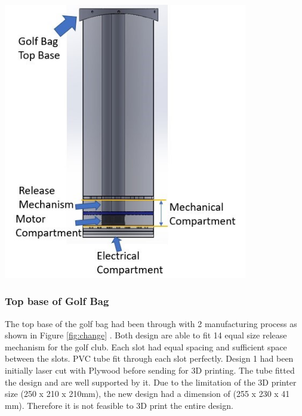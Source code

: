 \documentclass[11pt,landscape]{article}
\newenvironment{Figure}
  {\par\medskip\noindent\minipage{\linewidth}}
  {\endminipage\par\medskip}
\begin{document}
\begin{multicols}{3}
    
    \begin{Figure}
        \begin{center}
            \includegraphics[width=0.8\textwidth]{Figure16.jpg}
            \label{fig:golfbag}
        \end{center}
    \end{Figure}
    
    
    
    \subsubsection{Top base of Golf Bag}
    The top base of the golf bag had been through with 2 manufacturing process
    as shown in Figure \ref{fig:change} . Both design are able to fit 14 equal
    size release mechanism for the golf club. Each slot had equal spacing and
    sufficient space between the slots. PVC tube fit through each slot
    perfectly. Design 1 had been initially laser cut with Plywood before sending
    for 3D printing. The tube fitted the design and are well supported by it.
    Due to the limitation of the 3D printer size (250 x 210 x 210mm), the new
    design had a dimension of (255 x 230 x 41 mm). Therefore it is not feasible
    to 3D print the entire design.
    

\end{multicols}
\end{document}

